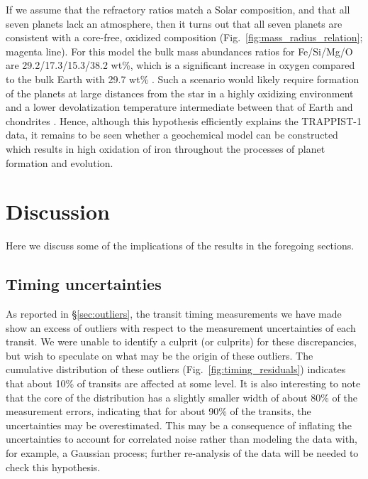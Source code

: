 \documentclass[twocolumn]{aastex63}
\begin{document}
If we assume that the refractory ratios match a Solar composition, and that all seven planets lack an atmosphere, then it turns out that all seven planets are consistent with a core-free, oxidized composition (Fig.\ \ref{fig:mass_radius_relation}; magenta line).  For this model the bulk mass abundances ratios for Fe/Si/Mg/O are 29.2/17.3/15.3/38.2 wt\%, which is a significant increase in oxygen compared to the bulk Earth with 29.7 wt\% \citep{McDonough2014}.
Such a scenario would likely require formation of the planets at large distances from the star in a highly oxidizing environment \citep{ElkinsTanton2008} and a lower  devolatization temperature intermediate between that of Earth and chondrites \citep{Wang2019}.  Hence, although this hypothesis efficiently explains the TRAPPIST-1 data, it remains to be seen whether a geochemical model can be constructed which results in high oxidation of iron throughout the processes of planet formation and evolution.

\section{Discussion} \label{sec:discussion}

Here we discuss some of the implications of the results in the foregoing sections.

\subsection{Timing uncertainties}

As reported in \S \ref{sec:outliers}, the transit timing measurements we have made show an excess of outliers with respect to the measurement uncertainties of each transit.  We were unable to identify a culprit (or culprits) for these discrepancies, but wish to speculate on what may be the origin of these outliers.  The cumulative distribution of these outliers (Fig.\ \ref{fig:timing_residuals}) indicates that about 10\% of transits
are affected at some level.  It is also interesting to note that the core of the distribution has a slightly smaller width of about 80\% of the measurement errors, indicating that for about 90\% of the transits, the uncertainties may be overestimated.  This may be a consequence of inflating the uncertainties to account for correlated noise rather than modeling the data with, for example, a Gaussian process;  further re-analysis of the data will be needed to check this hypothesis.
\end{document}
